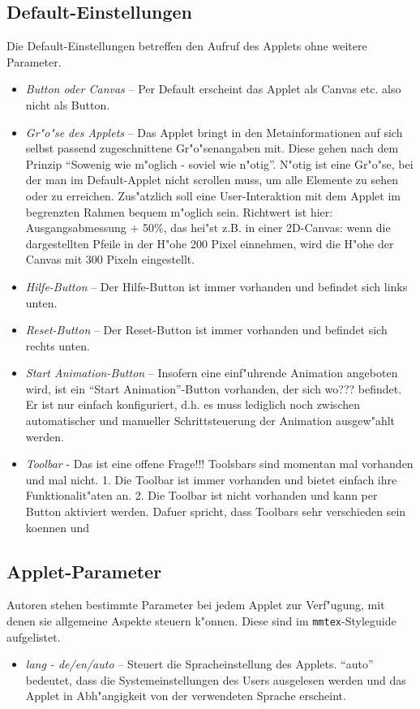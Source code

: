 \documentclass[a4paper,12pt]{article}
\begin{document}
\subsection{Default-Einstellungen}
Die Default-Einstellungen betreffen den Aufruf des Applets ohne weitere Parameter.
\begin{itemize}
\item \textit{Button oder Canvas} -- Per Default erscheint das Applet als Canvas etc. also
  nicht als Button.
\item \textit{Gr"o"se des Applets} -- Das Applet bringt in den Metainformationen auf sich
  selbst passend zugeschnittene Gr"o"senangaben mit. Diese gehen nach dem Prinzip "`Sowenig
  wie m"oglich - soviel wie n"otig"'. N"otig ist eine Gr"o"se, bei der man im Default-Applet
  nicht scrollen muss, um alle Elemente zu sehen oder zu erreichen. Zus"atzlich soll eine
  User-Interaktion mit dem Applet im begrenzten Rahmen bequem m"oglich sein. Richtwert ist
  hier: Ausgangsabmessung + 50\%, das hei"st z.B. in einer 2D-Canvas: wenn die dargestellten
  Pfeile in der H"ohe 200 Pixel einnehmen, wird die H"ohe der Canvas mit 300 Pixeln
  eingestellt.
\item \textit{Hilfe-Button} -- Der Hilfe-Button ist immer vorhanden und befindet sich links
  unten.
\item \textit{Reset-Button} -- Der Reset-Button ist immer vorhanden und befindet sich rechts
  unten.
\item \textit{Start Animation-Button} -- Insofern eine einf"uhrende Animation angeboten wird,
  ist ein "`Start Animation"'-Button vorhanden, der sich wo??? befindet. Er ist nur einfach
  konfiguriert, d.h. es muss lediglich noch zwischen automatischer und manueller
  Schrittsteuerung der Animation ausgew"ahlt werden.
\item \textit{Toolbar} - Das ist eine offene Frage!!! Toolsbars sind momentan mal vorhanden
  und mal nicht. 
1. Die Toolbar ist immer vorhanden und bietet einfach ihre Funktionalit"aten an.
2. Die Toolbar ist nicht vorhanden und kann per Button aktiviert werden. Dafuer spricht,
dass Toolbars sehr verschieden sein koennen und 
\end{itemize}
\subsection{Applet-Parameter}
Autoren stehen bestimmte Parameter bei jedem Applet zur Verf"ugung, mit denen sie allgemeine
Aspekte steuern k"onnen. Diese sind im \verb|mmtex|-Styleguide aufgelistet.
\begin{itemize}
\item \textit{lang - de/en/auto} -- Steuert die Spracheinstellung des Applets. "`auto"'
  bedeutet, dass die Systemeinstellungen des Users ausgelesen werden und das Applet in
  Abh"angigkeit von der verwendeten Sprache erscheint.
\end{itemize}
\end{document}
